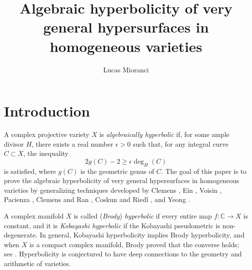\documentclass[11pt]{amsart}
\title{Algebraic hyperbolicity of very general hypersurfaces in homogeneous varieties}
\author{Lucas Mioranci}
\numberwithin{equation}{section}
\theoremstyle{definition}
\theoremstyle{remark}
\begin{document}


\maketitle


\begin{prelims}

\DisplayAbstractInEnglish

\bigskip

\DisplayKeyWords

\medskip

\DisplayMSCclass

\end{prelims}



\newpage

\setcounter{tocdepth}{1}

\tableofcontents





\section{Introduction}

A complex projective variety $X$ is \textit{algebraically hyperbolic} if, for some ample divisor $H$, there exists a real number $\epsilon > 0$ such that, for any integral curve $C\subset X$, the inequality
\[ 2g(C)-2\ge \epsilon \deg_H(C) \]
is satisfied, where $g(C)$ is the geometric genus of $C$. The goal of this paper is to prove the algebraic hyperbolicity of very general hypersurfaces in homogeneous varieties by generalizing techniques developed by Clemens \cite{Cl86, Cl03}, Ein \cite{Ei88, Ei91}, Voisin \cite{Vo96,Vo98}, Pacienza \cite{Pa03,Pa04}, Clemens and Ran \cite{ClR04}, Coskun and Riedl \cite{CR19a,CR19}, and Yeong \cite{Y22}.

A complex manifold $X$ is called (\textit{Brody}) \textit{hyperbolic} if every entire map $f\colon \mathbb{C}\to X$ is constant, and it is \textit{Kobayashi hyperbolic} if the Kobayashi pseudometric is non-degenerate. In general, Kobayashi hyperbolicity implies Brody hyperbolicity, and when $X$ is a compact complex manifold, Brody proved that the converse holds; see \cite{Br78}. Hyperbolicity is conjectured to have deep connections to the geometry and arithmetic of varieties. 
\end{document}
